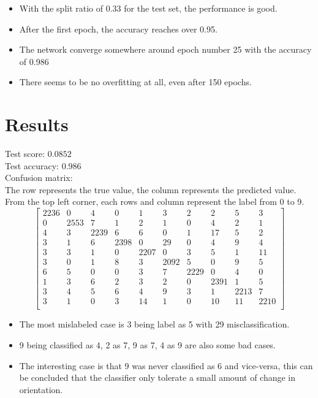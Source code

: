 \documentclass[paper=a4, fontsize=11pt]{scrartcl} %
\begin{document}
	\begin{itemize}
		\item With the split ratio of 0.33 for the test set, the performance is good.
		\item After the first epoch, the accuracy reaches over 0.95.
		\item The network converge somewhere around epoch number 25 with the accuracy of 0.986
		\item There seems to be no overfitting at all, even after 150 epochs.
	\end{itemize}
	

\section{Results}
    Test score: $0.0852$ \\
    Test accuracy: $0.986$ \\
    Confusion matrix: \\
    The row represents the true value, the column represents the predicted value.\\
    From the top left corner, each rows and column represent the label from 0 to 9.
    \[ \left[ \begin{array}{cccccccccc}
        2236 &    0 &    4 &    0 &    1 &    3 &    2 &    2 &    5 &    3 \\
           0 & 2553 &    7 &    1 &    2 &    1 &    0 &    4 &    2 &    1 \\
           4 &    3 & 2239 &    6 &    6 &    0 &    1 &   17 &    5 &    2 \\
           3 &    1 &    6 & 2398 &    0 &   29 &    0 &    4 &    9 &    4 \\
           3 &    3 &    1 &    0 & 2207 &    0 &    3 &    5 &    1 &   11 \\
           3 &    0 &    1 &    8 &    3 & 2092 &    5 &    0 &    9 &    5 \\
           6 &    5 &    0 &    0 &    3 &    7 & 2229 &    0 &    4 &    0 \\
           1 &    3 &    6 &    2 &    3 &    2 &    0 & 2391 &    1 &    5 \\
           3 &    4 &    5 &    6 &    4 &    9 &    3 &    1 & 2213 &    7 \\
           3 &    1 &    0 &    3 &   14 &    1 &    0 &   10 &   11 & 2210 \\
    \end{array} \right] \]
    
    \begin{itemize}
    	\item The most mislabeled case is 3 being label as 5 with 29 misclassification.
    	\item 9 being classified as 4, 2 as 7, 9 as 7, 4 as 9 are also some bad cases.
    	\item The interesting case is that 9 was never classified as 6 and vice-versa, this can be concluded that the classifier only tolerate a small amount of change in orientation.
    \end{itemize}
\end{document}
